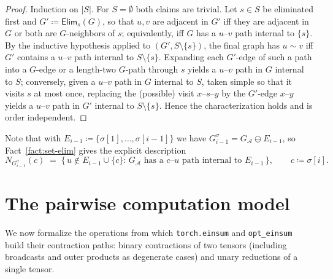 \documentclass[11pt]{article}
\newcommand{\calA}{\mathcal{A}}
\newcommand{\eliminatevg}[2]{\mathsf{Elim}_{#1}(#2)}
\newcommand{\graphform}[1]{G_{#1}}
\newcommand{\opteinsum}{\texttt{opt\_einsum}}
\newcommand{\torcheinsum}{\texttt{torch.einsum}}
\theoremstyle{plain}
\theoremstyle{definition}
\theoremstyle{remark}
\begin{document}
\begin{proof}
Induction on $|S|$.  For $S=\emptyset$ both claims are trivial.  Let
$s \in S$ be eliminated first and $G' \coloneqq \eliminatevg{s}{G}$, so that
$u,v$ are adjacent in $G'$ iff they are adjacent in $G$ or both are
$G$-neighbors of $s$; equivalently, iff $G$ has a $u$--$v$ path internal
to $\{s\}$.  By the inductive hypothesis applied to $(G', S\setminus\{s\})$,
the final graph has $u \sim v$ iff $G'$ contains a $u$--$v$ path internal
to $S \setminus \{s\}$.  Expanding each $G'$-edge of such a path into a
$G$-edge or a length-two $G$-path through $s$ yields a $u$--$v$ path in
$G$ internal to $S$; conversely, given a $u$--$v$ path in $G$ internal to
$S$, taken simple so that it visits $s$ at most once, replacing the
(possible) visit $x$--$s$--$y$ by the $G'$-edge $x$--$y$ yields a
$u$--$v$ path in $G'$ internal to $S\setminus\{s\}$.  Hence the
characterization holds and is order independent.
\end{proof}

Note that with $E_{i-1} \coloneqq \{\sigma[1],\dots,\sigma[i-1]\}$ we have
$G^\sigma_{i-1} = \graphform{\calA} \ominus E_{i-1}$, so
Fact~\ref{fact:set-elim} gives the explicit description
\begin{equation}
\label{eq:nbhd}
   N_{G^\sigma_{i-1}}(c)
   \;=\;
   \bigl\{\, u \notin E_{i-1}\cup\{c\} :\,
   \graphform{\calA} \text{ has a } c\text{--}u \text{ path internal to }
   E_{i-1} \,\bigr\},
   \qquad c \coloneqq \sigma[i].
\end{equation}

\section{The pairwise computation model}
\label{sec:model}

We now formalize the operations from which \torcheinsum{} and
\opteinsum{} build their contraction paths: binary contractions of two
tensors (including broadcasts and outer products as degenerate cases) and
unary reductions of a single tensor.
\end{document}
